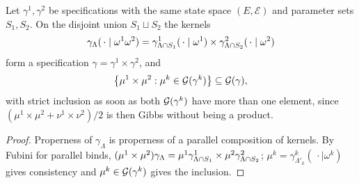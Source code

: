 \begin{example}
    \label{ex:app-product}
    \leanok

    Let $\gamma^1, \gamma^2$ be specifications with the same state space $(E,\mathcal E)$ and
    parameter sets $S_1, S_2$. On the disjoint union $S_1 \sqcup S_2$ the kernels
    \[\gamma_{\Lambda}(\,\cdot \mid \omega^1\omega^2)
      = \gamma^1_{\Lambda \cap S_1}(\,\cdot \mid \omega^1) \times
        \gamma^2_{\Lambda \cap S_2}(\,\cdot \mid \omega^2)\]
    form a specification $\gamma = \gamma^1 \times \gamma^2$, and
    \[\left\{ \mu^1 \times \mu^2 : \mu^k \in \mathcal{G}(\gamma^k) \right\} \subseteq \mathcal{G}(\gamma),\]
    with strict inclusion as soon as both $\mathcal{G}(\gamma^k)$ have more than one element, since
    $(\mu^1 \times \mu^2 + \nu^1 \times \nu^2)/2$ is then Gibbs without being a product.
\end{example}
\begin{proof}
    \leanok

    Properness of $\gamma_\Lambda$ is properness of a parallel composition of kernels.  By
    Fubini for parallel binds,
    $(\mu^1 \times \mu^2)\gamma_\Lambda
      = \mu^1\gamma^1_{\Lambda \cap S_1} \times \mu^2\gamma^2_{\Lambda \cap S_2}$;
    $\mu^k = \gamma^k_{\Lambda'_k}(\,\cdot \mid \omega^k)$ gives consistency and
    $\mu^k \in \mathcal{G}(\gamma^k)$ gives the inclusion.
\end{proof}

